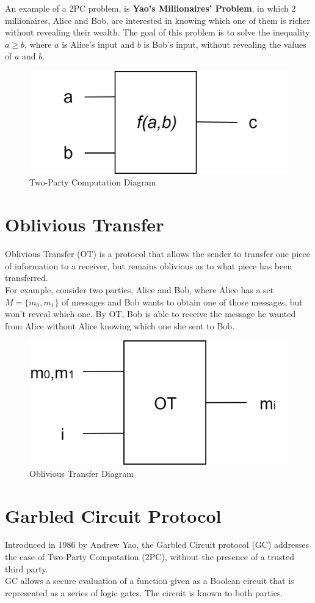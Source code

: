 An example of a 2PC problem, is \textbf{Yao's Millionaires' Problem}, in which 2 millionaires, Alice and Bob, are
interested in knowing which one of them is richer without revealing their wealth. The goal of this problem is to solve
the inequality $a\geq b$, where $a$ is Alice's input and $b$ is Bob's input, without revealing the values
of $a$ and $b$.

\renewcommand{\figurename}{Figure}
\begin{figure}[H]
\centering
\includegraphics[width=.4\linewidth]{./figures/mpc/two_party_computation_scheme}
\caption{Two-Party Computation Diagram}
\label{fig:tpcscheme}
\end{figure}

\section{Oblivious Transfer}
Oblivious Transfer (OT) is a protocol that allows the sender to transfer one piece of information
to a receiver, but remains oblivious as to what piece has been transferred.\\
For example, consider two parties, Alice and Bob, where Alice has a set $M = \{m_0,m_1\}$ of messages
and Bob wants to obtain one of those messages, but won't reveal which one. By OT, Bob is able to
receive the message he wanted from Alice without Alice knowing which one she sent to Bob.

\renewcommand{\figurename}{Figure}
\begin{figure}[H]
\centering
\includegraphics[width=.4\linewidth]{./figures/mpc/OT}
\caption{Oblivious Transfer Diagram}
\label{fig:otscheme}
\end{figure}

\section{Garbled Circuit Protocol}
Introduced in 1986 by Andrew Yao, the Garbled Circuit protocol (GC) addresses the case
of Two-Party Computation (2PC), without the presence of a trusted third party.\\
GC allows a secure evaluation of a function given as a Boolean circuit that is represented as a series of logic gates.
The circuit is known to both parties.\\

